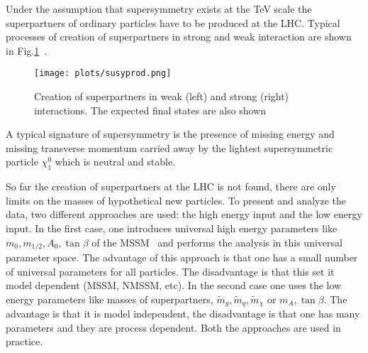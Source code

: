 \documentclass{cernyrep}
\begin{document}
Under the assumption that super\-symmetry exists at the TeV scale the superpartners of ordinary particles have to be produced at the LHC. Typical processes of creation of superpartners in strong and weak interaction are shown in Fig.\ref{sprod}~\cite{susyprob}.
\begin{figure}[htb]
\begin{center}
\leavevmode
\texttt{[image: plots/susyprod.png]}
\end{center}
\caption{Creation of superpartners in weak (left) and strong (right) interactions. The expected final states are also shown}
\label{sprod}
\end{figure}
A typical signature of supersymmetry is the presence of missing energy and missing transverse momentum carried away by the lightest supersymmetric particle  $\chi^0_1$ which is neutral and stable.


So far the creation of superpartners at the LHC is not found, there are only limits on the masses of hypothetical new particles. To present and analyze the data, two different approaches are used:
the high energy input and the low energy input. In the first case, one introduces universal high energy parameters like $m_0,m_{1/2}, A_0, \tan\beta$  of the MSSM~\cite{MSSM} and performs the analysis  in this universal parameter space. The advantage of this approach is that one has a small number of universal parameters for all particles. The disadvantage is that this set it model dependent (MSSM, NMSSM, etc). In the second case one uses the low energy parameters like masses of superpartners, $\tilde m_g, \tilde m_q, \tilde m_\chi$ or $ m_A,\tan\beta$. The advantage is that it is model independent, the disadvantage is that one has many parameters and they are process dependent. Both the approaches are used in practice. 
\end{document}
